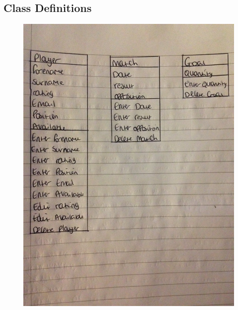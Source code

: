 \subsection{Class Definitions}
\begin{figure}[H]
	\includegraphics[width=150mm]{classdef}
\end{figure}

